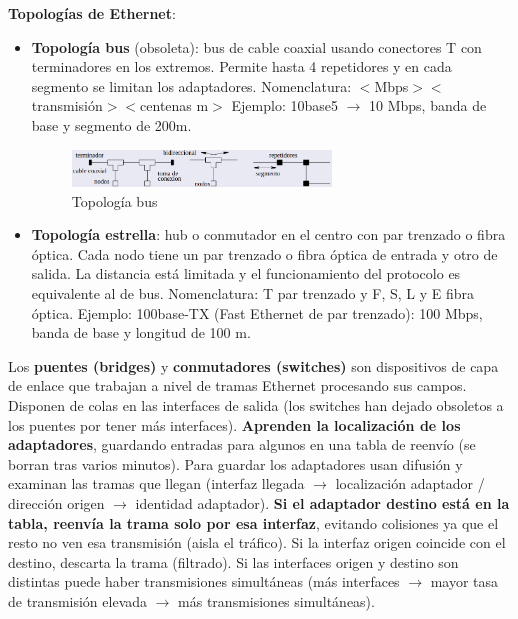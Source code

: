 \documentclass{article}
\begin{document}
\textbf{Topologías de Ethernet}:
\begin{itemize}
    \item \textbf{Topología bus} (obsoleta): bus de cable coaxial usando conectores T con terminadores en los extremos. Permite hasta 4 repetidores y en cada segmento se limitan los adaptadores. Nomenclatura: $<$Mbps$>$$<$transmisión$>$$<$centenas m$>$ Ejemplo: 10base5 $\xrightarrow{}$ 10 Mbps, banda de base y segmento de 200m.
    \begin{figure}[h]
    \centering
    \includegraphics[width=0.65\textwidth]{img-t5/img_377_16.png}
    \caption{Topología bus}
    \end{figure}

    \item \textbf{Topología estrella}: hub o conmutador en el centro con par trenzado o fibra óptica. Cada nodo tiene un par trenzado o fibra óptica de entrada y otro de salida. La distancia está limitada y el funcionamiento del protocolo es equivalente al de bus. Nomenclatura: T par trenzado y F, S, L y E fibra óptica. Ejemplo: 100base-TX (Fast Ethernet de par trenzado): 100 Mbps, banda de base y longitud de 100 m.
    
\end{itemize}

Los \textbf{puentes (bridges)} y \textbf{conmutadores (switches)} son dispositivos de capa de enlace que trabajan a nivel de tramas Ethernet procesando sus campos. Disponen de
colas en las interfaces de salida (los switches han dejado obsoletos a los puentes por tener más interfaces). \textbf{Aprenden la localización de los adaptadores}, guardando entradas para algunos en una tabla de reenvío (se borran tras varios minutos). Para guardar los adaptadores usan difusión y examinan las tramas que llegan (interfaz llegada $\xrightarrow{}$ localización adaptador / dirección origen $\xrightarrow{}$ identidad adaptador). \textbf{Si el adaptador destino está en la tabla, reenvía la trama solo por esa interfaz}, evitando colisiones ya que el resto no ven esa transmisión (aisla el tráfico). Si la interfaz origen coincide con el destino, descarta la trama (filtrado). Si las interfaces origen y destino son distintas puede haber transmisiones simultáneas
(más interfaces $\xrightarrow{}$ mayor tasa de transmisión elevada $\xrightarrow{}$ más transmisiones simultáneas).
\end{document}
